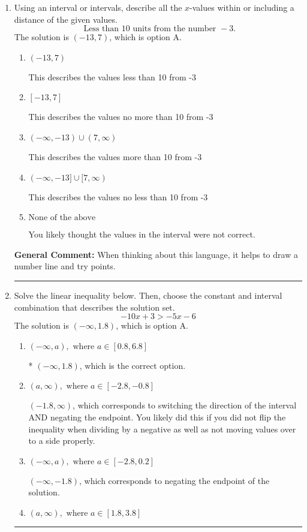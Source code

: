 \documentclass{extbook}[14pt]
\newcommand{\litem}[1]{\item #1

\rule{\textwidth}{0.4pt}}
\begin{document}
\begin{enumerate}\litem{
Using an interval or intervals, describe all the $x$-values within or including a distance of the given values.
\[ \text{ Less than } 10 \text{ units from the number } -3. \]The solution is \( (-13, 7) \), which is option A.\begin{enumerate}[label=\Alph*.]
\item \( (-13, 7) \)

This describes the values less than 10 from -3
\item \( [-13, 7] \)

This describes the values no more than 10 from -3
\item \( (-\infty, -13) \cup (7, \infty) \)

This describes the values more than 10 from -3
\item \( (-\infty, -13] \cup [7, \infty) \)

This describes the values no less than 10 from -3
\item \( \text{None of the above} \)

You likely thought the values in the interval were not correct.
\end{enumerate}

\textbf{General Comment:} When thinking about this language, it helps to draw a number line and try points.
}
\litem{
Solve the linear inequality below. Then, choose the constant and interval combination that describes the solution set.
\[ -10x + 3 > -5x -6 \]The solution is \( (-\infty, 1.8) \), which is option A.\begin{enumerate}[label=\Alph*.]
\item \( (-\infty, a), \text{ where } a \in [0.8, 6.8] \)

* $(-\infty, 1.8)$, which is the correct option.
\item \( (a, \infty), \text{ where } a \in [-2.8, -0.8] \)

 $(-1.8, \infty)$, which corresponds to switching the direction of the interval AND negating the endpoint. You likely did this if you did not flip the inequality when dividing by a negative as well as not moving values over to a side properly.
\item \( (-\infty, a), \text{ where } a \in [-2.8, 0.2] \)

 $(-\infty, -1.8)$, which corresponds to negating the endpoint of the solution.
\item \( (a, \infty), \text{ where } a \in [1.8, 3.8] \)


\end{enumerate}}
\end{enumerate}
\end{document}
